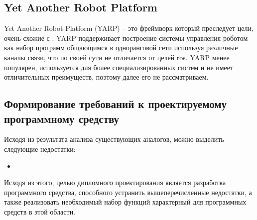\subsection{Yet Another Robot Platform}
Yet Another Robot Platform (YARP) \cite{metta2006yarp} -- это фреймворк который
преследует цели, очень схожие с \ros{}. YARP поддерживает построение системы
управления роботом как набор программ общающимся в одноранговой сети используя
различные каналы связи, что по своей сути не отличается от целей ros{}. YARP
менее популярен, используется для более специализированных систем и не имеет
отличительных преимуществ, поэтому далее его не рассматриваем.


\subsection{Формирование требований к проектируемому программному средству}


Исходя из результата анализа существующих аналогов, можно выделить следующие недостатки:

\begin{itemize}
	\item {}
\end{itemize}

Исходя из этого, целью дипломного проектирования является разработка
программного средства, способного устранить вышеперечисленные недостатки, а
также реализовать необходимый набор функций характерный для программных средств
в этой области.


%
%
